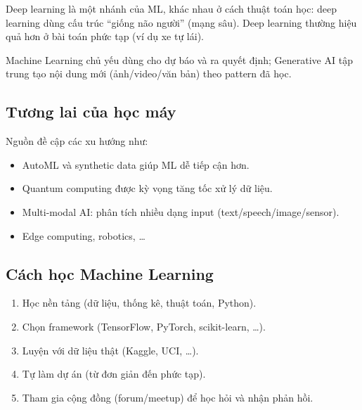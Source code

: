 \begin{ynghia}[title={ML vs Deep Learning}]
Deep learning là một nhánh của ML, khác nhau ở cách thuật toán học: deep learning dùng cấu trúc “giống não người” (mạng sâu).
Deep learning thường hiệu quả hơn ở bài toán phức tạp (ví dụ xe tự lái).
\end{ynghia}

\begin{ynghia}[title={ML vs Generative AI}]
Machine Learning chủ yếu dùng cho dự báo và ra quyết định; Generative AI tập trung tạo nội dung mới (ảnh/video/văn bản) theo pattern đã học.
\end{ynghia}

\subsection{Tương lai của học máy}

\begin{phuongphap}[title={Một số xu hướng}]
Nguồn đề cập các xu hướng như:
\begin{itemize}
  \item AutoML và synthetic data giúp ML dễ tiếp cận hơn.
  \item Quantum computing được kỳ vọng tăng tốc xử lý dữ liệu.
  \item Multi-modal AI: phân tích nhiều dạng input (text/speech/image/sensor).
  \item Edge computing, robotics, \ldots
\end{itemize}
\end{phuongphap}

\subsection{Cách học Machine Learning}

\begin{phuongphap}[title={Lộ trình}]
\begin{enumerate}
  \item Học nền tảng (dữ liệu, thống kê, thuật toán, Python).
  \item Chọn framework (TensorFlow, PyTorch, scikit-learn, \ldots).
  \item Luyện với dữ liệu thật (Kaggle, UCI, \ldots).
  \item Tự làm dự án (từ đơn giản đến phức tạp).
  \item Tham gia cộng đồng (forum/meetup) để học hỏi và nhận phản hồi.
\end{enumerate}
\end{phuongphap}

